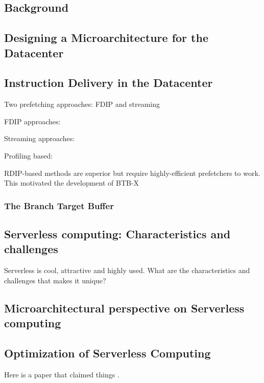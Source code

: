 \documentclass[../main.tex]{subfiles}
\begin{document}
\ifx\chapincluded\undefined
  \begin{refsection}
 \fi


\chapter{Background}

\section{Designing a Microarchitecture for the Datacenter}
\cite{kanev15_profil,ferdman12_clear_cloud}


\section{Instruction Delivery in the Datacenter}


Two prefetching approaches: FDIP and streaming


FDIP approaches: \cite{reinman99_fetch_direc_instr_prefet, kumar17_boomer,kumar18_blast_throug_front_end_bottl_with_shotg,kumar20_shoot_down_server_front_end_bottl}

Streaming approaches:
\cite{ferdman08_tempor,ferdman11_proac_instr_fetch,kaynak13_shift,kaynak15_confl}

Profiling based:

RDIP-based methods are superior but require highly-efficient prefetchers to work. This motivated the development of BTB-X

\subsection{The Branch Target Buffer}


\section{Serverless computing: Characteristics and challenges}
Serverless is cool, attractive and highly used. What are the characteristics and challenges that makes it unique?


\section{Microarchitectural perspective on Serverless computing}



\section{Optimization of Serverless Computing}


Here is a paper that claimed things \cite{kanev15_profil}.



\ifx\chapincluded\undefined
  \printbibliography
  \end{refsection}
 \fi
\end{document}
